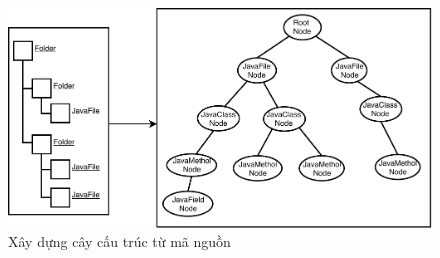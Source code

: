 \documentclass[12pt]{report}
\begin{document}
\begin{figure}[!htbp]
	\centering
	\vspace{0.5cm}
	\includegraphics[scale=0.32]{images/structure_tree}
	\caption{Xây dựng cây cấu trúc từ mã nguồn}
	\label{fig:universe}
\end{figure}
\end{document}
